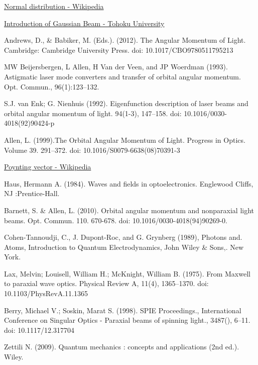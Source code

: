 \documentclass[11pt,a4paper]{article}
\numberwithin{equation}{section}
\begin{document}
\begin{thebibliography}{999}
	\href{https://en.wikipedia.org/wiki/Normal_distribution}{Normal distribution - Wikipedia}
	
	\href{https://flex.phys.tohoku.ac.jp/~rsaito/saito20-GaussianBeam.pdf}{Introduction of Gaussian Beam - Tohoku University}
	
	Andrews, D., \& Babiker, M. (Eds.). (2012). The Angular Momentum of Light. Cambridge: Cambridge University Press. doi: 10.1017/CBO9780511795213
	
	
	MW Beijersbergen, L Allen, H Van der Veen, and JP Woerdman (1993). Astigmatic laser mode converters and transfer of orbital angular momentum. Opt. Commun., 96(1):123–132.
	
	 S.J. van Enk; G. Nienhuis (1992). Eigenfunction description of laser beams and orbital angular momentum of light. 94(1-3), 147–158. doi: 10.1016/0030-4018(92)90424-p     
	 
	 Allen, L. (1999).The Orbital Angular Momentum of Light. Progress in Optics.  Volume 39. 291–372. doi: 10.1016/S0079-6638(08)70391-3
	  
	 \href{https://en.wikipedia.org/wiki/Poynting_vector}{Poynting vector - Wikipedia}
	  
	 Haus, Hermann A. (1984). Waves and fields in optoelectronics. Englewood Cliffs, NJ :Prentice-Hall.
	 
	 Barnett, S. \& Allen, L. (2010). Orbital angular momentum and nonparaxial light beams. Opt. Commun. 110. 670-678. doi: 10.1016/0030-4018(94)90269-0.
	 
	 Cohen-Tannoudji, C., J. Dupont-Roc, and G. Grynberg (1989), Photons and. Atoms, Introduction to Quantum Electrodynamics, John Wiley \& Sons,. New York.
	 
	 Lax, Melvin; Louisell, William H.; McKnight, William B. (1975). From Maxwell to paraxial wave optics. Physical Review A, 11(4), 1365–1370. doi: 10.1103/PhysRevA.11.1365
	 
	  Berry, Michael V.; Soskin, Marat S. (1998). SPIE Proceedings., International Conference on Singular Optics - Paraxial beams of spinning light., 3487(), 6–11. doi: 10.1117/12.317704 
	  
	  Zettili N. (2009). Quantum mechanics : concepts and applications (2nd ed.). Wiley.
	  

\end{thebibliography}
\end{document}
